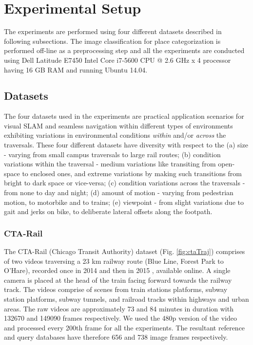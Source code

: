 \documentclass[letterpaper, 10 pt, conference]{ieeeconf}  %
\begin{document}


\section{Experimental Setup}
The experiments are performed using four different datasets described in following subsections. The image classification for place categorization is performed off-line as a preprocessing step and all the experiments are conducted using Dell Latitude E7450 Intel Core i7-5600 CPU @ 2.6 GHz x 4 processor having 16 GB RAM and running Ubuntu 14.04.

\subsection{Datasets}
The four datasets used in the experiments are practical application scenarios for visual SLAM and seamless navigation within different types of environments exhibiting variations in environmental conditions \emph{within} and/or \emph{across} the traversals. These four different datasets have diversity with respect to the (a) size - varying from small campus traversals to large rail routes; (b) condition variations within the traversal - medium variations like transiting from open-space to enclosed ones, and extreme variations by making such transitions from bright to dark space or vice-versa; (c) condition variations across the traversals - from none to day and night; (d) amount of motion - varying from pedestrian motion, to motorbike and to trains; (e) viewpoint - from slight variations due to gait and jerks on bike, to deliberate lateral offsets along the footpath. 

\subsubsection{CTA-Rail}
The CTA-Rail (Chicago Transit Authority) dataset (Fig. \ref{fig:ctaTraj}) comprises of two videos traversing a 23 km railway route (Blue Line, Forest Park to O'Hare), recorded once in 2014 \cite{ctaRail2014} and then in 2015 \cite{ctaRail2015}, available online. A single camera is placed at the head of the train facing forward towards the railway track. The videos comprise of scenes from train stations platforms, subway station platforms, subway tunnels, and railroad tracks within highways and urban areas. The raw videos are approximately 73 and 84 minutes in duration with 132670 and 149090 frames respectively. We used the 480p version of the video and processed every 200th frame for all the experiments. The resultant reference and query databases have therefore 656 and 738 image frames respectively.
\end{document}
